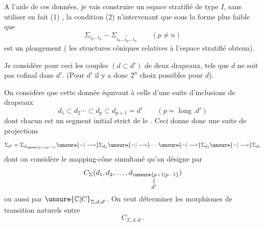 
A l'aide de ces données, je vais
construire un espace stratifié de type \(I\),
sans utiliser en fait 
(1) , la condition (2) n'intervenant
que sous la forme plus faible que
\[
 \Sigma_{i_0\ldots i_n}
 -\Sigma_{i_0\ldots\widehat{i_p}\ldots i_n}\qquad(p\ne n)
\]
est un plongement 
( les structures côniques
relatives à l'espace stratifié obtenu).

Je considère pour ceci les couples
 \((d\subset d')\) de deux drapeaux,
 tels que
\(d\)  ne soit pas cofinal dans \(d'\).
(Pour \(d'\) 
il y a donc \(2^n\) choix possibles pour \(d\)).



On considère que cette donnée équivaut à celle d'une
suite d'inclusions de drapeaux
\[
 d_1\subset d_2\cdots\subset d_p\subset d_{p+1}=d'
 \qquad(p=\operatorname{long}.d')
\]
dont chacun est un segment initial strict de
le .
Ceci donne donc  une
suite de projections
\[
 \Sigma_{d'}=\Sigma_{d_{\unsure{p+1|p-1}}}\unsure{-|\longrightarrow}\Sigma_{d_p}
 \unsure{-|\longrightarrow}\cdots\unsure{-|\longrightarrow}\Sigma_{d_2}
 \unsure{-|\longrightarrow}\Sigma_{d_1}
\]
dont on considère le mapping-cône simultané
qu'on désigne par
\[
 C_\Sigma(d_1,d_2,\ldots,
 \underset{\substack{\Vert\\d'}}{d_{\unsure{p+1|p-1}}})
\]
ou aussi par \(\unsure{\mathbb C|C}_{\Sigma,d,d'}\).
On veut déterminer les
morphismes  de transition naturels entre
\[
 C_{\Sigma,d,d'}.
\]

